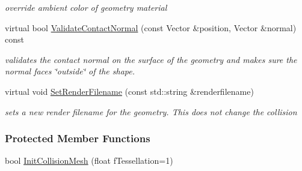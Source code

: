 \begin{DoxyCompactItemize}
\begin{DoxyCompactList}\small\item\em override ambient color of geometry material \item\end{DoxyCompactList}\item 
virtual bool \hyperlink{classOpenRAVE_1_1KinBody_1_1Link_1_1GEOMPROPERTIES_a80c6877ca0a3b0f5104b00ccfbc7b591}{ValidateContactNormal} (const Vector \&position, Vector \&normal) const 
\begin{DoxyCompactList}\small\item\em validates the contact normal on the surface of the geometry and makes sure the normal faces \char`\"{}outside\char`\"{} of the shape. \item\end{DoxyCompactList}\item 
\hypertarget{classOpenRAVE_1_1KinBody_1_1Link_1_1GEOMPROPERTIES_aa558a74c9ca66b0b53f772e6a6893c0f}{
virtual void \hyperlink{classOpenRAVE_1_1KinBody_1_1Link_1_1GEOMPROPERTIES_aa558a74c9ca66b0b53f772e6a6893c0f}{SetRenderFilename} (const std::string \&renderfilename)}
\label{classOpenRAVE_1_1KinBody_1_1Link_1_1GEOMPROPERTIES_aa558a74c9ca66b0b53f772e6a6893c0f}

\begin{DoxyCompactList}\small\item\em sets a new render filename for the geometry. This does not change the collision \item\end{DoxyCompactList}\end{DoxyCompactItemize}
\subsubsection*{Protected Member Functions}
\begin{DoxyCompactItemize}
\item 
bool \hyperlink{classOpenRAVE_1_1KinBody_1_1Link_1_1GEOMPROPERTIES_a77e9273e5d79606152b85b4863f3b6b4}{InitCollisionMesh} (float fTessellation=1)
\end{DoxyCompactItemize}
